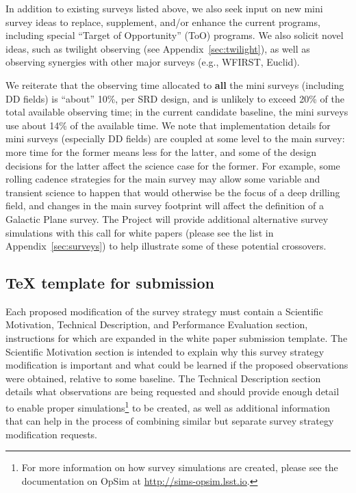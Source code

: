 \documentclass[DM,lsstdraft,toc,usenatbib]{lsstdoc}
\begin{document}
In addition to existing surveys listed above, we also seek input on new mini survey ideas 
to replace, supplement, and/or enhance the current programs, including special ``Target of Opportunity'' (ToO) 
programs. We also solicit novel ideas, such as twilight observing (see Appendix~\ref{sec:twilight}),
as well as observing synergies with other major surveys (e.g., WFIRST, Euclid). 

We reiterate that the observing time allocated to {\bf all} the mini surveys 
(including DD fields) is ``about'' 10\%, per SRD design, and is unlikely to exceed 20\% of the total available
observing time; in the current candidate baseline, the mini surveys use about 14\% of the available time. 
We note that implementation details for mini surveys (especially DD fields)
are coupled at some level to the main survey: more time for the former means less 
for the latter, and some of the design decisions for the latter affect the science
case for the former.  For example, some rolling cadence strategies for the main survey  
may allow some variable and transient science to happen that would otherwise be the 
focus of a deep drilling field, and changes in the main survey footprint will affect the 
definition of a Galactic Plane survey. The Project will provide additional alternative 
survey simulations with this call for white papers (please see the list in Appendix~\ref{sec:surveys}) 
to help illustrate some of these potential crossovers. 

\subsection{TeX template for submission \label{sec:textemplate}} 

Each proposed modification of the survey strategy must contain a Scientific Motivation, Technical Description, and Performance Evaluation section, instructions for which are expanded in the white paper submission template. The Scientific Motivation section is intended to explain why this survey strategy modification is important and what could be learned if the proposed observations were obtained, relative to some baseline. The Technical Description section details what observations are being requested and should provide enough detail to enable proper simulations\footnote{For more information on how survey simulations are created, please see the documentation on OpSim at \href{http://sims-opsim.lsst.io}{http://sims-opsim.lsst.io}.} to be created, as well as additional information that can help in the process of combining similar but separate survey strategy modification requests. 
\end{document}
